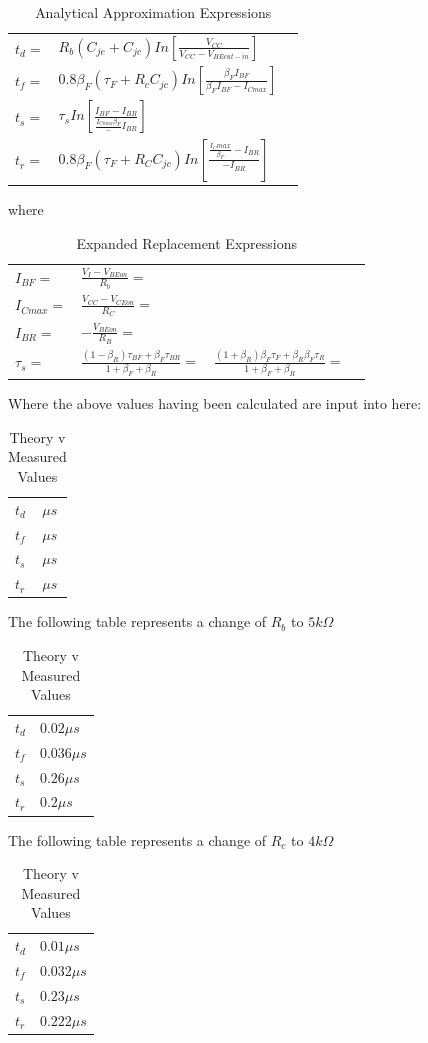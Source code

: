 \documentclass[12pt]{article}
\begin{document}
\begin{table}[h]
\centering
\begin{tabular}{lll}
$t_d=$ & $R_b\left(C_{je}+C_{jc}\right)In\left[\frac{V_{CC}}{V_{CC}-V_{BE cut-in}}\right]$ & \\
$t_f=$ & $0.8\beta_F\left(\tau_F+R_cC_{jc}\right)In\left[\frac{\beta_FI_{BF}}{\beta_FI_{BF}-I_{C max}}\right]$ & \\
$t_s=$ & $\tau_sIn\left[\frac{I_{BF}-I_{BR}}{\frac{I_{C max}{\beta_F}}-I_{BR}}\right]$ & \\
$t_r=$ & $0.8\beta_F\left(\tau_F+R_CC_{jc}\right)In\left[\frac{\frac{I_C max}{\beta_F}-I_{BR}}{-I_{BR}}\right]$ & 
\end{tabular}
\caption{Analytical Approximation Expressions}
\end{table}
where
\begin{table}[h]
\centering
\begin{tabular}{llll}
$I_{BF}=$	& $\frac{V_I-V_{BE on}}{R_b}=$	& & \\
$I_{C max}=$	& $\frac{V_{CC}-V_{CE on}}{R_C}=$	& & \\
$I_{BR}=$	& $-\frac{V_{BE on}}{R_B}=$	& & \\
$\tau_s=$	& $\frac{(1-\beta_R)\tau_{BF}+\beta_F\tau_{BR}}{1+\beta_F+\beta_R}=$ &  $\frac{(1+\beta_R)\beta_F\tau_F+\beta_R\beta_F\tau_R}{1+\beta_F+\beta_R}=$	& \\
\end{tabular}
\caption{Expanded Replacement Expressions}
\end{table}
Where the above values having been calculated are input into here:
\begin{table}[h]
\centering
\begin{tabular}{ll}
$t_d$ & $\mu s$\\
$t_f$ & $\mu s$\\
$t_s$ & $\mu s$\\
$t_r$ & $\mu s$
\end{tabular}
\caption{Theory v Measured Values}
\end{table}
The following table represents a change of $R_b$ to $5k\Omega$
\begin{table}[h]
\centering
\begin{tabular}{ll}
$t_d$ & $0.02\mu s$\\
$t_f$ & $0.036\mu s$\\
$t_s$ & $0.26\mu s$\\
$t_r$ & $0.2\mu s$
\end{tabular}
\caption{Theory v Measured Values}
\end{table}
The following table represents a change of $R_c$ to $4k\Omega$
\begin{table}[h]
\centering
\begin{tabular}{ll}
$t_d$ & $0.01\mu s$\\
$t_f$ & $0.032\mu s$\\
$t_s$ & $0.23\mu s$\\
$t_r$ & $0.222\mu s$
\end{tabular}
\caption{Theory v Measured Values}
\end{table}
\end{document}
